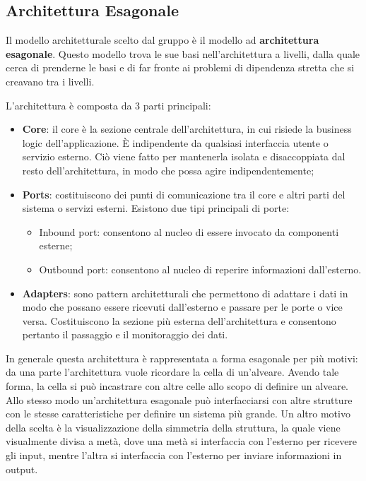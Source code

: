 \subsection{Architettura Esagonale}
\par Il modello architetturale scelto dal gruppo è il modello ad \textbf{architettura esagonale}. Questo modello trova le sue basi nell'architettura a livelli, dalla quale cerca di prenderne le basi e di far fronte ai problemi di dipendenza stretta che si creavano tra i livelli.
\par L'architettura è composta da 3 parti principali:
\begin{itemize}
    \item \textbf{Core}: il core è la sezione centrale dell'architettura, in cui risiede la business logic dell'applicazione. È indipendente da qualsiasi interfaccia utente o servizio esterno. Ciò viene fatto per mantenerla isolata e disaccoppiata dal resto dell'architettura, in modo che possa agire indipendentemente;
    \item \textbf{Ports}: costituiscono dei punti di comunicazione tra il core e altri parti del sistema o servizi esterni. Esistono due tipi principali di porte:
    \begin{itemize}
        \item Inbound port: consentono al nucleo di essere invocato da componenti esterne;
        \item Outbound port: consentono al nucleo di reperire informazioni dall'esterno.
    \end{itemize}
    \item \textbf{Adapters}: sono pattern architetturali che permettono di adattare i dati in modo che possano essere ricevuti dall'esterno e passare per le porte o vice versa. Costituiscono la sezione più esterna dell'architettura e consentono pertanto il passaggio e il monitoraggio dei dati.
\end{itemize}
\par In generale questa architettura è rappresentata a forma esagonale per più motivi: da una parte l'architettura vuole ricordare la cella di un'alveare. Avendo tale forma, la cella si può incastrare con altre celle allo scopo di definire un alveare. Allo stesso modo un'architettura esagonale può interfacciarsi con altre strutture con le stesse caratteristiche per definire un sistema più grande. Un altro motivo della scelta è la visualizzazione della simmetria della struttura, la quale viene visualmente divisa a metà, dove una metà si interfaccia con l'esterno per ricevere gli input, mentre l'altra si interfaccia con l'esterno per inviare informazioni in output.

